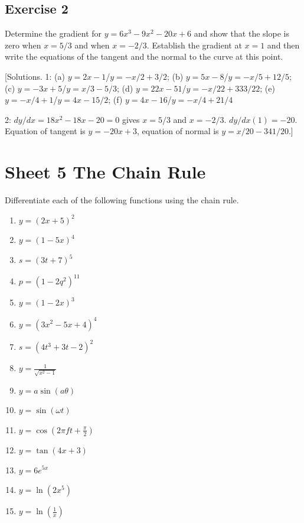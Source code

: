 \documentclass[
  english,
  11pt,
  oneside]{book}
\providecommand{\tightlist}{%
  \setlength{\itemsep}{0pt}\setlength{\parskip}{0pt}}
\newcommand{\slide}{}
\theoremstyle{definition}
\theoremstyle{definition}
\theoremstyle{definition}
\theoremstyle{definition}
\theoremstyle{remark}
\begin{document}
\slide

\subsection*{Exercise 2}\label{exercise-2-1}

Determine the gradient for \(y=6x^3-9x^2-20x+6\) and show that the slope is zero when \(x=5/3\) and when \(x=-2/3\). Establish the gradient at \(x=1\) and then write the equations of the tangent and the normal to the curve at this point.

\slide

{[}Solutions. 1: (a) \(y=2x-1\)/\(y=-x/2+3/2\); (b) \(y=5x-8\)/\(y=-x/5+12/5\); (c) \(y=-3x+5\)/\(y=x/3-5/3\); (d) \(y=22x-51\)/\(y=-x/22+333/22\); (e) \(y=-x/4+1\)/\(y=4x-15/2\); (f) \(y=4x-16\)/\(y=-x/4+21/4\)

2: \(dy/dx = 18x^2-18x-20 = 0\) gives \(x=5/3\) and \(x=-2/3\). \(dy/dx(1) = -20\). Equation of tangent is \(y=-20x+3\), equation of normal is \(y=x/20-341/20\).{]}

\slide

\section{Sheet 5 The Chain Rule}\label{sheet-5-the-chain-rule}

Differentiate each of the following functions using the chain rule.

\begin{enumerate}
\def\labelenumi{\arabic{enumi}.}
\tightlist
\item
  \(y=(2x+5)^2\)
\item
  \(y=(1-5x)^4\)
\item
  \(s=(3t+7)^5\)
\item
  \(p=(1-2q^2)^{11}\)
\item
  \(y=(1-2x)^3\)
\item
  \(y=(3x^2-5x+4)^4\)
\item
  \(s=(4t^3+3t-2)^2\)
\item
  \(y=\frac1{\sqrt{x^2-1}}\)
\item
  \(y=a\sin(a\theta)\)
\item
  \(y=\sin(\omega t)\)
\item
  \(y=\cos(2\pi ft+\frac{\pi}2)\)
\item
  \(y=\tan(4x+3)\)
\item
  \(y=6e^{5x}\)
\item
  \(y=\ln(2x^5)\)
\item
  \(y=\ln(\frac 1x)\)
\end{enumerate}
\end{document}
